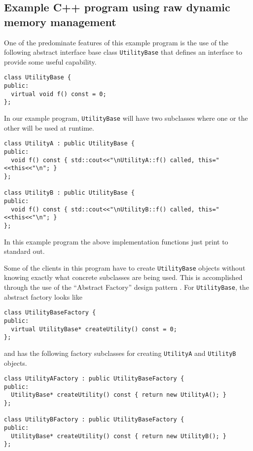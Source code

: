 \documentclass[pdf,ps2pdf,11pt]{SANDreport}
\begin{document}
%
\subsection{Example C++ program using raw dynamic memory management}
\label{rcpbg:sec:original-program}
%

One of the predominate features of this example program is the use of
the following abstract interface base class {}\texttt{Utility\-Base}
that defines an interface to provide some useful capability.

{\small\begin{verbatim}
class UtilityBase {
public:
  virtual void f() const = 0;
};
\end{verbatim}}

In our example program, {}\texttt{Utility\-Base} will have two
subclasses where one or the other will be used at runtime.

{\small\begin{verbatim}
class UtilityA : public UtilityBase {
public:
  void f() const { std::cout<<"\nUtilityA::f() called, this="<<this<<"\n"; }
};

class UtilityB : public UtilityBase {
public:
  void f() const { std::cout<<"\nUtilityB::f() called, this="<<this<<"\n"; }
};
\end{verbatim}}

{}\noindent{}In this example program the above implementation
functions just print to standard out.

Some of the clients in this program have to create
{}\texttt{Utility\-Base} objects without knowing exactly what concrete
subclasses are being used.  This is accomplished through the use of
the ``Abstract Factory'' design pattern {}\cite{ref:gama_et_al_1995}.
For {}\texttt{Utility\-Base}, the abstract factory looks like

{\small\begin{verbatim}
class UtilityBaseFactory {
public:
  virtual UtilityBase* createUtility() const = 0;
};
\end{verbatim}}

{}\noindent{}and has the following factory subclasses for creating
{}\texttt{Utility\-A} and {}\texttt{Utility\-B} objects.

{\small\begin{verbatim}
class UtilityAFactory : public UtilityBaseFactory {
public:
  UtilityBase* createUtility() const { return new UtilityA(); }
};

class UtilityBFactory : public UtilityBaseFactory {
public:
  UtilityBase* createUtility() const { return new UtilityB(); }
};
\end{verbatim}}
\end{document}
